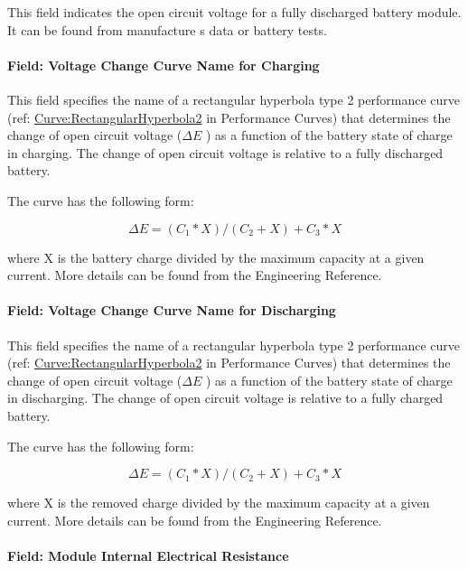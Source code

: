 This field indicates the open circuit voltage for a fully discharged battery module. It can be found from manufacture s data or battery tests.

\paragraph{Field: Voltage Change Curve Name for Charging}\label{field-voltage-change-curve-name-for-charging}

This field specifies the name of a rectangular hyperbola type 2 performance curve (ref: \hyperref[curverectangularhyperbola2]{Curve:RectangularHyperbola2} in Performance Curves) that determines the change of open circuit voltage (\(\Delta E\) ) as a function of the battery state of charge in charging. The change of open circuit voltage is relative to a fully discharged battery.

The curve has the following form:

\begin{equation}
\Delta E = ({C_1}*X)/({C_2} + X) + {C_3}*X
\end{equation}

where X is the battery charge divided by the maximum capacity at a given current. More details can be found from the Engineering Reference.

\paragraph{Field: Voltage Change Curve Name for Discharging}\label{field-voltage-change-curve-name-for-discharging}

This field specifies the name of a rectangular hyperbola type 2 performance curve (ref: \hyperref[curverectangularhyperbola2]{Curve:RectangularHyperbola2} in Performance Curves) that determines the change of open circuit voltage (\(\Delta E\) ) as a function of the battery state of charge in discharging. The change of open circuit voltage is relative to a fully charged battery.

The curve has the following form:

\begin{equation}
\Delta E = ({C_1}*X)/({C_2} + X) + {C_3}*X
\end{equation}

where X is the removed charge divided by the maximum capacity at a given current. More details can be found from the Engineering Reference.

\paragraph{Field: Module Internal Electrical Resistance}\label{field-module-internal-electrical-resistance}

